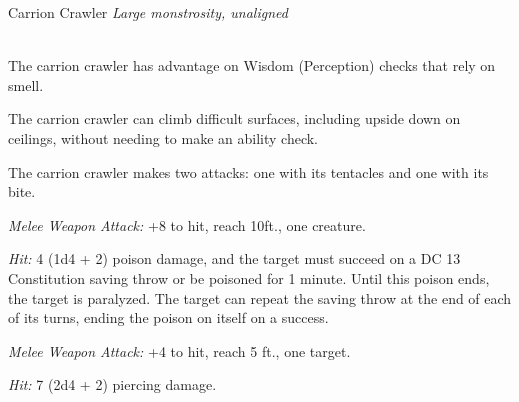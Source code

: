 \documentclass[palace_of_the_silver_princess]{subfiles}
\begin{document}
\begin{monsterbox}{Carrion Crawler}
    \textit{Large monstrosity, unaligned}\\
    \hline
    \basics[%
        armorclass = 13,
        hitpoints  = 25,
        speed      = {30 ft., climb 30 ft.}
    ]
    \hline
    \stats[
        STR = \stat{14},
        DEX = \stat{13},
        CON = \stat{16},
        INT = \stat{1},
        WIS = \stat{12},
        CHA = \stat{5}
    ]
    \hline
    \details[
        senses = {darkvision 60 ft., passive Perception 13},
        languages = {---},
        challenge = {2 (450 XP)},
    ]
    \hline
    \\[1mm]
    \begin{monsteraction}
        The carrion crawler has advantage on Wisdom (Perception) checks
        that rely on smell.
    \end{monsteraction}
    \begin{monsteraction}
        The carrion crawler can climb difficult surfaces, including
        upside down on ceilings, without needing to make an ability
        check.
    \end{monsteraction}
    \begin{monsteraction}[Multiattack]
        The carrion crawler makes two attacks: one with its tentacles
        and one with its bite.
    \end{monsteraction}

    \begin{monsteraction}[Tentacles]
        \textit{Melee Weapon Attack:} +8 to hit, reach 10ft., one
        creature. 

        \textit{Hit:} 4 (1d4 + 2) poison damage, and the target must
        succeed on a DC 13 Constitution saving throw or be poisoned for
        1 minute. Until this poison ends, the target is paralyzed. The
        target can repeat the saving throw at the end of each of its
        turns, ending the poison on itself on a success.
    \end{monsteraction}

    \begin{monsteraction}[Bite]
        \textit{Melee Weapon Attack:} +4 to hit, reach 5 ft., one
        target.

        \textit{Hit:} 7 (2d4 + 2) piercing damage.
    \end{monsteraction}
\end{monsterbox}
\end{document}
